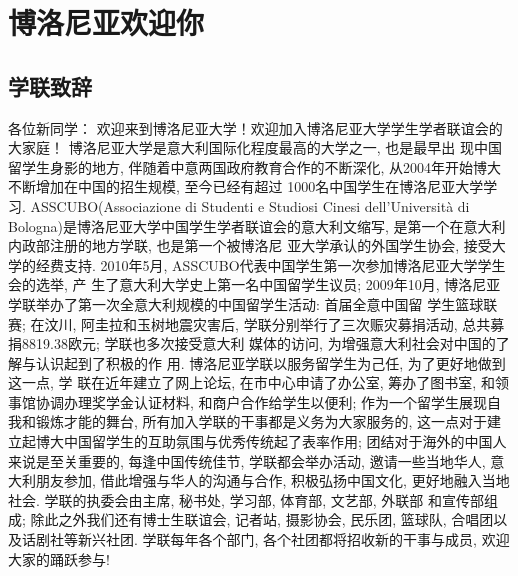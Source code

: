 
% 


\chapter{博洛尼亚欢迎你}                 %

\section{学联致辞}

各位新同学：
             欢迎来到博洛尼亚大学！欢迎加入博洛尼亚大学学生学者联谊会的大家庭！
          博洛尼亚大学是意大利国际化程度最高的大学之一, 也是最早出 现中国留学生身影的地方, 伴随着中意两国政府教育合作的不断深化, 从2004年开始博大不断增加在中国的招生规模, 至今已经有超过 1000名中国学生在博洛尼亚大学学习.
          ASSCUBO(Associazione di Studenti e Studiosi Cinesi dell’Università di Bologna)是博洛尼亚大学中国学生学者联谊会的意大利文缩写, 是第一个在意大利内政部注册的地方学联, 也是第一个被博洛尼 亚大学承认的外国学生协会, 接受大学的经费支持. 2010年5月, ASSCUBO代表中国学生第一次参加博洛尼亚大学学生会的选举, 产 生了意大利大学史上第一名中国留学生议员; 2009年10月, 博洛尼亚 学联举办了第一次全意大利规模的中国留学生活动: 首届全意中国留 学生篮球联赛; 在汶川, 阿圭拉和玉树地震灾害后, 学联分别举行了三次赈灾募捐活动, 总共募捐8819.38欧元; 学联也多次接受意大利 媒体的访问, 为增强意大利社会对中国的了解与认识起到了积极的作 用.
          博洛尼亚学联以服务留学生为己任, 为了更好地做到这一点, 学 联在近年建立了网上论坛, 在市中心申请了办公室, 筹办了图书室, 和领事馆协调办理奖学金认证材料, 和商户合作给学生以便利; 作为一个留学生展现自我和锻炼才能的舞台, 所有加入学联的干事都是义务为大家服务的, 这一点对于建立起博大中国留学生的互助氛围与优秀传统起了表率作用; 团结对于海外的中国人来说是至关重要的, 每逢中国传统佳节, 学联都会举办活动, 邀请一些当地华人, 意大利朋友参加, 借此增强与华人的沟通与合作, 积极弘扬中国文化, 更好地融入当地社会.
           学联的执委会由主席, 秘书处, 学习部, 体育部, 文艺部, 外联部 和宣传部组成; 除此之外我们还有博士生联谊会, 记者站, 摄影协会, 民乐团, 篮球队, 合唱团以及话剧社等新兴社团. 学联每年各个部门, 各个社团都将招收新的干事与成员, 欢迎大家的踊跃参与!

